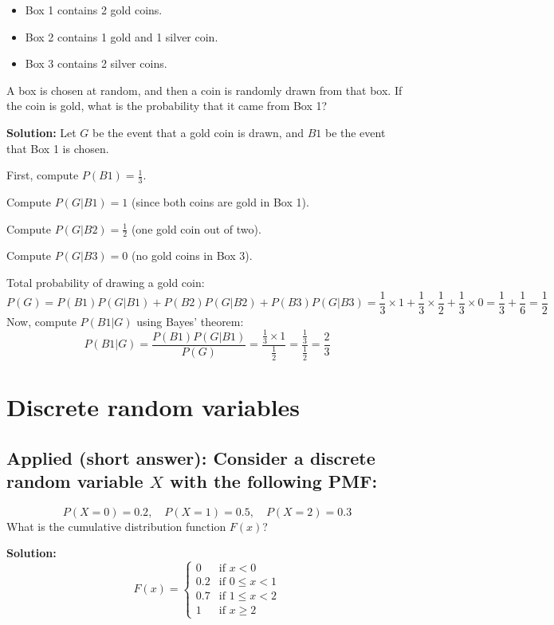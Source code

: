 \documentclass[12pt]{article}
\begin{document}
\begin{itemize}
    \item Box 1 contains 2 gold coins.
    \item Box 2 contains 1 gold and 1 silver coin.
    \item Box 3 contains 2 silver coins.
\end{itemize}

A box is chosen at random, and then a coin is randomly drawn from that box. If the coin is gold, what is the probability that it came from Box 1?

\textbf{Solution:}
Let \( G \) be the event that a gold coin is drawn, and \( B1 \) be the event that Box 1 is chosen.

First, compute \( P(B1) = \frac{1}{3} \).

Compute \( P(G | B1) = 1 \) (since both coins are gold in Box 1).

Compute \( P(G | B2) = \frac{1}{2} \) (one gold coin out of two).

Compute \( P(G | B3) = 0 \) (no gold coins in Box 3).

Total probability of drawing a gold coin:
\[
P(G) = P(B1) P(G | B1) + P(B2) P(G | B2) + P(B3) P(G | B3) = \frac{1}{3} \times 1 + \frac{1}{3} \times \frac{1}{2} + \frac{1}{3} \times 0 = \frac{1}{3} + \frac{1}{6} = \frac{1}{2}
\]
Now, compute \( P(B1 | G) \) using Bayes' theorem:
\[
P(B1 | G) = \frac{P(B1) P(G | B1)}{P(G)} = \frac{\frac{1}{3} \times 1}{\frac{1}{2}} = \frac{\frac{1}{3}}{\frac{1}{2}} = \frac{2}{3}
\]


\section{Discrete random variables}

\subsection{Applied (short answer): Consider a discrete random variable \( X \) with the following PMF:}
\[
P(X = 0) = 0.2, \quad P(X = 1) = 0.5, \quad P(X = 2) = 0.3
\]
What is the cumulative distribution function \( F(x) \)?

\textbf{Solution:} 
\[
F(x) = 
\begin{cases} 
0 & \text{if } x < 0 \\
0.2 & \text{if } 0 \leq x < 1 \\
0.7 & \text{if } 1 \leq x < 2 \\
1 & \text{if } x \geq 2
\end{cases}
\]
\end{document}
